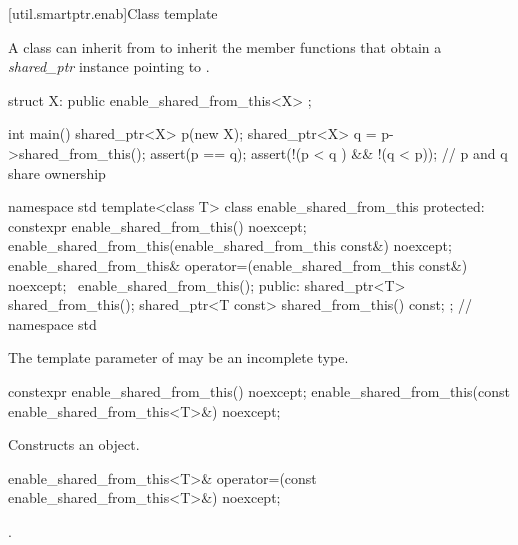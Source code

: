 [util.smartptr.enab]{Class template }

\pnum
{}%
A class  can inherit from 
to inherit the  member functions that obtain
a \textit{shared_ptr} instance pointing to .

\pnum
\enterexample

\begin{codeblock}
struct X: public enable_shared_from_this<X> {
};

int main() {
  shared_ptr<X> p(new X);
  shared_ptr<X> q = p->shared_from_this();
  assert(p == q);
  assert(!(p < q ) && !(q < p)); // p and q share ownership
}
\end{codeblock}
\exitexample

\begin{codeblock}
namespace std {
  template<class T> class enable_shared_from_this {
  protected:
    constexpr enable_shared_from_this() noexcept;
    enable_shared_from_this(enable_shared_from_this const&) noexcept;
    enable_shared_from_this& operator=(enable_shared_from_this const&) noexcept;
    ~enable_shared_from_this();
  public:
    shared_ptr<T> shared_from_this();
    shared_ptr<T const> shared_from_this() const;
  };
} // namespace std
\end{codeblock}

\pnum
The template parameter  of 
may be an incomplete type.

%
\begin{itemdecl}
constexpr enable_shared_from_this() noexcept;
enable_shared_from_this(const enable_shared_from_this<T>&) noexcept;
\end{itemdecl}

\begin{itemdescr}
\pnum\effects  Constructs an  object.
\end{itemdescr}

%
%
\begin{itemdecl}
enable_shared_from_this<T>& operator=(const enable_shared_from_this<T>&) noexcept;
\end{itemdecl}

\begin{itemdescr}
\pnum\returns  {}.
\end{itemdescr}

